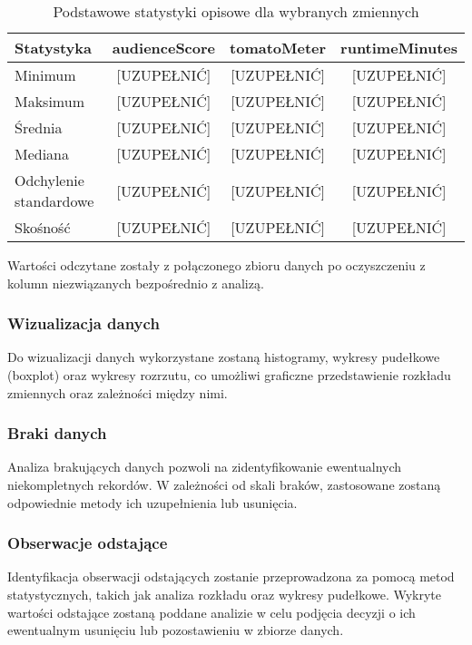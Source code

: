 \documentclass[a4paper,12pt]{article}
\begin{document}
\begin{table}[h!]
\centering
\caption{Podstawowe statystyki opisowe dla wybranych zmiennych}
\label{tab:stats}
\begin{tabular}{lccc}
\toprule
Statystyka & audienceScore & tomatoMeter & runtimeMinutes \\
\midrule
Minimum    & [UZUPEŁNIĆ] & [UZUPEŁNIĆ] & [UZUPEŁNIĆ] \\
Maksimum   & [UZUPEŁNIĆ] & [UZUPEŁNIĆ] & [UZUPEŁNIĆ] \\
Średnia    & [UZUPEŁNIĆ] & [UZUPEŁNIĆ] & [UZUPEŁNIĆ] \\
Mediana    & [UZUPEŁNIĆ] & [UZUPEŁNIĆ] & [UZUPEŁNIĆ] \\
Odchylenie standardowe & [UZUPEŁNIĆ] & [UZUPEŁNIĆ] & [UZUPEŁNIĆ] \\
Skośność   & [UZUPEŁNIĆ] & [UZUPEŁNIĆ] & [UZUPEŁNIĆ] \\
\bottomrule
\end{tabular}
\end{table}

Wartości odczytane zostały z połączonego zbioru danych po oczyszczeniu z kolumn niezwiązanych bezpośrednio z analizą.


\subsubsection{Wizualizacja danych}
Do wizualizacji danych wykorzystane zostaną histogramy, wykresy pudełkowe (boxplot) oraz wykresy rozrzutu, co umożliwi graficzne przedstawienie rozkładu zmiennych oraz zależności między nimi.


\subsubsection{Braki danych}
Analiza brakujących danych pozwoli na zidentyfikowanie ewentualnych niekompletnych rekordów. W zależności od skali braków, zastosowane zostaną odpowiednie metody ich uzupełnienia lub usunięcia.


\subsubsection{Obserwacje odstające}
Identyfikacja obserwacji odstających zostanie przeprowadzona za pomocą metod statystycznych, takich jak analiza rozkładu oraz wykresy pudełkowe. Wykryte wartości odstające zostaną poddane analizie w celu podjęcia decyzji o ich ewentualnym usunięciu lub pozostawieniu w zbiorze danych.
\end{document}
